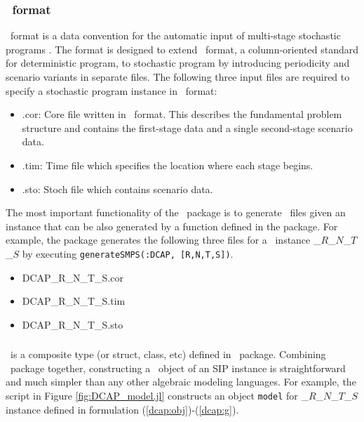 \subsubsection{\smps\ format} \label{subsec:smps}
\smps\ format is a data convention for the automatic input of multi-stage stochastic programs \cite{smps}. The format is designed to extend \mps\ format, a column-oriented standard for deterministic program, to stochastic program by introducing periodicity and scenario variants in separate files. The following three input files are required to specify a stochastic program instance in \smps\ format:
\begin{itemize}
	\item .cor: Core file written in \mps\ format. This describes the fundamental problem structure and contains the first-stage data and a single second-stage scenario data.
	\item .tim: Time file which specifies the location where each stage begins.
	\item .sto: Stoch file which contains scenario data.
\end{itemize}
The most important functionality of the \siplibtwo\ package is to generate \smps\ files given an instance that can be also generated by a function defined in the package. For example, the package generates the following three files for a \dcap\ instance \dcap\_$R$\_$N$\_$T$\_$S$ by executing \texttt{generateSMPS(:DCAP, [R,N,T,S])}.
\begin{itemize}
	\item DCAP\_R\_N\_T\_S.cor
	\item DCAP\_R\_N\_T\_S.tim
	\item DCAP\_R\_N\_T\_S.sto
\end{itemize}

\subsubsection{\jumpmodel}
\jumpmodel\ is a composite type (or struct, class, etc) defined in \jump\ package. Combining \structjump\ package together, constructing a \jumpmodel\ object of an SIP instance is straightforward and much simpler than any other algebraic modeling languages. For example, the script in Figure \ref{fig:DCAP_model.jl} constructs an object \texttt{model} for \dcap\_$R$\_$N$\_$T$\_$S$ instance defined in formulation (\ref{dcap:obj})-(\ref{dcap:g}). 

